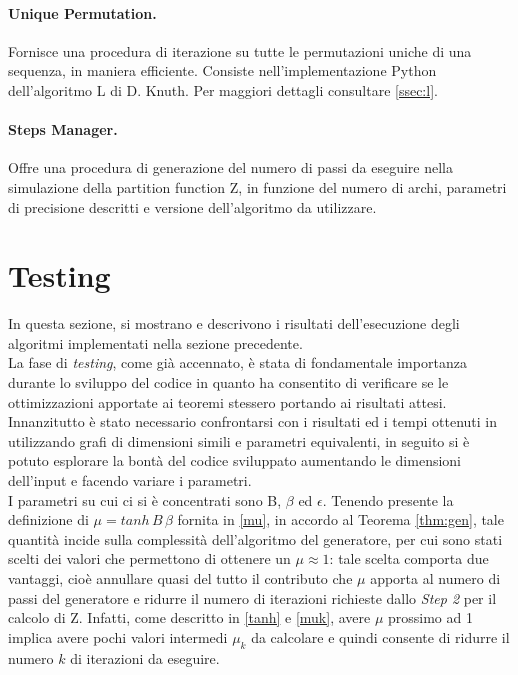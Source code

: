 \paragraph{Unique Permutation.}
Fornisce una procedura di iterazione su tutte le permutazioni uniche di una sequenza, in maniera efficiente. Consiste nell'implementazione Python dell'algoritmo L di D. Knuth. Per maggiori dettagli consultare \ref{ssec:l}.
\paragraph{Steps Manager.}
Offre una procedura di generazione del numero di passi da eseguire nella simulazione della partition function Z, in funzione del numero di archi, parametri di precisione descritti e versione dell'algoritmo da utilizzare.
\section{Testing}\label{sec:testing}
In questa sezione, si mostrano e descrivono i risultati dell'esecuzione degli algoritmi implementati nella sezione precedente.\\
La fase di \textit{testing}, come già accennato, è stata di fondamentale importanza durante lo sviluppo del codice in quanto ha consentito di verificare se le ottimizzazioni apportate ai teoremi stessero portando ai risultati attesi.\\
Innanzitutto è stato necessario confrontarsi con i risultati ed i tempi ottenuti in \cite{rinaldi2016approximation} utilizzando grafi di dimensioni simili e parametri equivalenti, in seguito si è potuto esplorare la bontà del codice sviluppato aumentando le dimensioni dell'input e facendo variare i parametri.\\
I parametri su cui ci si è concentrati sono B, $\beta$ ed $\epsilon$. Tenendo presente la definizione di $\mu = tanh\,B\,\beta$ fornita in \ref{mu}, in accordo al Teorema \ref{thm:gen}, tale quantità incide sulla complessità dell'algoritmo del generatore, per cui sono stati scelti dei valori che permettono di ottenere un $\mu \approx 1$: tale scelta comporta due vantaggi, cioè annullare quasi del tutto il contributo che $\mu$ apporta al numero di passi del generatore e ridurre il numero di iterazioni richieste dallo \textit{Step 2} per il calcolo di Z. Infatti, come descritto in \ref{tanh} e \ref{muk}, avere $\mu$ prossimo ad 1 implica avere pochi valori intermedi $\mu_k$ da calcolare e quindi consente di ridurre il numero $k$ di iterazioni da eseguire.\\
